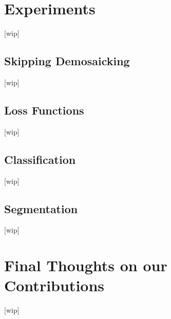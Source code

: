 \chapter{\label{chap:experiments}Experiments}
[wip]

\section{Skipping Demosaicking}
[wip]

\section{Loss Functions}
[wip]

\section{Classification}
[wip]

\section{Segmentation}
[wip]


\chapter{Final Thoughts on our Contributions}
[wip]
